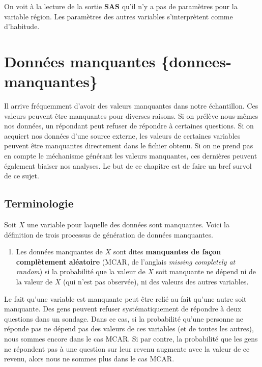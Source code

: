 \documentclass[
  11pt,
  letterpaper,
]{book}
\providecommand{\tightlist}{%
  \setlength{\itemsep}{0pt}\setlength{\parskip}{0pt}}
\theoremstyle{definition}
\theoremstyle{definition}
\theoremstyle{definition}
\theoremstyle{remark}
\begin{document}
On voit à la lecture de la sortie \textbf{SAS} qu'il n'y a pas de paramètres pour la variable région. Les paramètres des autres variables s'interprètent comme d'habitude.

\hypertarget{donnuxe9es-manquantes-donnees-manquantes}{%
\chapter{Données manquantes \{donnees-manquantes\}}\label{donnuxe9es-manquantes-donnees-manquantes}}

Il arrive fréquemment d'avoir des valeurs manquantes dans notre échantillon. Ces valeurs peuvent être manquantes pour diverses raisons. Si on prélève nous-mêmes nos données, un répondant peut refuser de répondre à certaines questions. Si on acquiert nos données d'une source externe, les valeurs de certaines variables peuvent être manquantes directement dans le fichier obtenu. Si on ne prend pas en compte le méchanisme générant les valeurs manquantes, ces dernières peuvent également biaiser nos analyses. Le but de ce chapitre est de faire un bref survol de ce sujet.

\hypertarget{terminologie}{%
\section{Terminologie}\label{terminologie}}

Soit \(X\) une variable pour laquelle des données sont manquantes. Voici la définition de trois processus de génération de données manquantes.

\begin{enumerate}
\def\labelenumi{\arabic{enumi})}
\tightlist
\item
  Les données manquantes de \(X\) sont dites \textbf{manquantes de façon complètement aléatoire} (MCAR, de l'anglais \emph{missing completely at random}) si la probabilité que la valeur de \(X\) soit manquante ne dépend ni de la valeur de \(X\) (qui n'est pas observée), ni des valeurs des autres variables.
\end{enumerate}

Le fait qu'une variable est manquante peut être relié au fait qu'une autre soit manquante. Des gens peuvent refuser systématiquement de répondre à deux questions dans un sondage. Dans ce cas, si la probabilité qu'une personne ne réponde pas ne dépend pas des valeurs de ces variables (et de toutes les autres), nous sommes encore dans le cas MCAR. Si par contre, la probabilité que les gens ne répondent pas à une question sur leur revenu augmente avec la valeur de ce revenu, alors nous ne sommes plus dans le cas MCAR.
\end{document}
